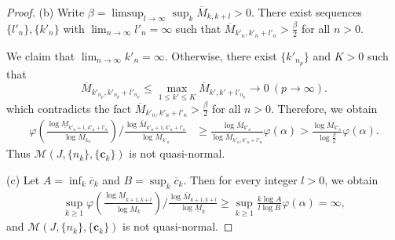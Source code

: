 \documentclass[12pt]{amsart}
\numberwithin{equation}{section}
\theoremstyle{plain}
\newtheorem{corollary}[theorem]{Corollary}
\theoremstyle{remark}
\theoremstyle{definition}
\newcommand{\om}{\overline{M}}
\newcommand{\um}{\underline{M}}
\newcommand{\ccc}{\mathbf{c}}
\newcommand{\f}{\frac}
\newcommand{\oc}{\overline{c}}
\renewcommand{\ge}{\geqslant}
\renewcommand{\le}{\leqslant}
\begin{document}
\begin{proof}
		(b) Write $\beta= \limsup_{l\to\infty}\sup_k \om_{k,k+l}>0$. 
		There exist sequences $\{l'_n\},\{k'_n\}$ with $\lim_{n\to\infty} l'_n=\infty$  such that $	\om_{k'_n,k'_n+l'_n}>\frac{\beta}2 $ for all $n>0$. 
		
		We claim that $\lim_{n\to\infty} k'_n=\infty $. Otherwise, there exist  $\{k'_{n_p}\}$  and  $K>0$ such that
		\[
		\om_{k'_{n_p},k'_{n_p}+l'_{n_p}}\le\max_{1\le k'\le K} \om_{k',k'+l'_{n_p}}\to 0\ (p\to\infty).
		\]	
which contradicts the fact $\om_{k'_n,k'_n+l'_n}>\frac{\beta}2 $ for all $n>0$. 		
		Therefore,  we obtain
		\begin{align*}
			\varphi\left(\frac{\log \um_{k'_n+1,k'_n+l'_n}}{\log \om_{k_n}}\right)\bigg/\frac{\log \om_{k'_n+1,k'_n+l'_n}}{\log \om_{k'_n}}&\ge\f{\log \om_{k'_n}}{\log \om_{k'_n,k'_n+l'_n}}\varphi\left(\alpha\right) 
			>\f{\log \om_{k'_n}}{\log \frac{\beta}2}\varphi\left(\alpha\right).
		\end{align*}
		Thus $\mathcal{M}(J,\{n_k\},\{\ccc_k\})$ is not quasi-normal.
		
		(c) Let $A=\inf_k \oc_k$ and $B=\sup_k \oc_k$. Then for every integer $l>0$, we obtain
	\begin{align*}
			\sup_{k\ge 1}\varphi\left(\frac{\log \um_{k+1,k+l}}{\log \om_{k}}\right)\bigg/\frac{\log \om_{k+1,k+l}}{\log \um_{k}}\ge \sup_{k\ge  1}\f {k\log A}{l\log B}\varphi\left(\alpha\right)=\infty,
		\end{align*}
		and $\mathcal{M}(J,\{n_k\},\{\ccc_k\})$ is not quasi-normal.
	\end{proof}  
	
	
	
	

	
	
\end{document}
